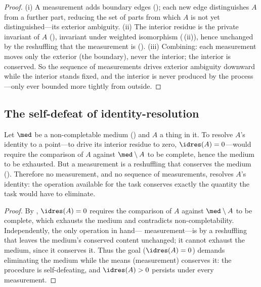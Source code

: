\begin{proof}
(i) A measurement adds boundary edges (); each new edge
distinguishes $A$ from a further part, reducing the set of parts from which $A$ is
not yet distinguished---its exterior ambiguity. (ii) The interior residue is the
private invariant of $A$ (), invariant under
weighted isomorphism (\,(ii)), hence unchanged by the reshuffling
that the measurement is (). (iii) Combining: each
measurement moves only the exterior (the boundary), never the interior; the
interior is conserved. So the sequence of measurements drives exterior ambiguity
downward while the interior stands fixed, and the interior is never produced by
the process---only ever bounded more tightly from outside.
\end{proof}

\subsection{The self-defeat of identity-resolution}

\begin{theorem}
\label{thm:self-defeat}
Let $\med$ be a non-completable medium \textup{(}\textup{)}
and $A$ a thing in it. To resolve $A$'s identity to a point---to drive its
interior residue to zero, $\idres(A)=0$---would require the comparison of $A$
against $\med\setminus A$ to be complete, hence the medium to be exhausted. But a
measurement is a reshuffling that conserves the medium
\textup{(}\textup{)}. Therefore no measurement, and
no sequence of measurements, resolves $A$'s identity: the operation available for
the task conserves exactly the quantity the task would have to eliminate.
\end{theorem}

\begin{proof}
By , $\idres(A)=0$ requires the comparison of $A$
against $\med\setminus A$ to be complete, which exhausts the medium and
contradicts non-completability. Independently, the only operation in hand---
measurement---is by  a reshuffling that leaves the
medium's conserved content unchanged; it cannot exhaust the medium, since it
conserves it. Thus the goal ($\idres(A)=0$) demands eliminating the medium while
the means (measurement) conserves it: the procedure is self-defeating, and
$\idres(A)>0$ persists under every measurement.
\end{proof}

